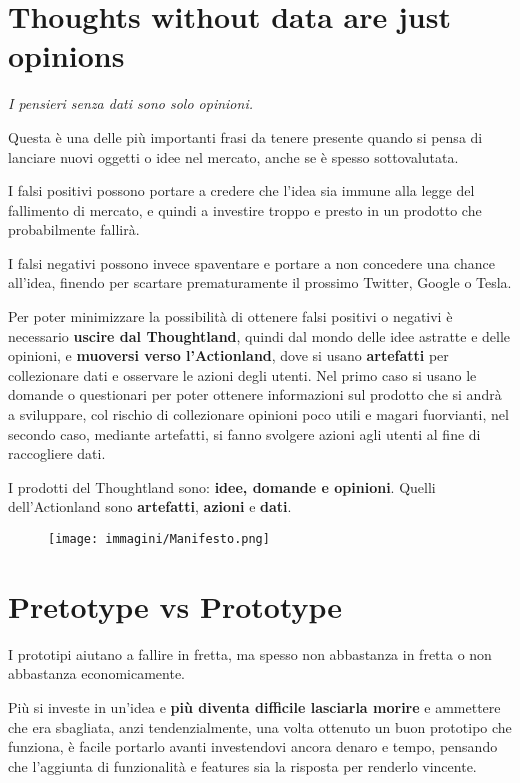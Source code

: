 \pagebreak

\section{Thoughts without data are just opinions}

\begin{flushleft}
	\textit{I pensieri senza dati sono solo opinioni.}
\end{flushleft}

Questa è una delle più importanti frasi da tenere presente quando si pensa di lanciare nuovi oggetti o idee nel mercato, anche se è spesso sottovalutata.

I falsi positivi possono portare a credere che l'idea sia immune alla legge del
fallimento di mercato, e quindi a investire troppo e presto in un prodotto che probabilmente fallirà.

I falsi negativi possono invece spaventare e portare a non concedere una chance all'idea, finendo per scartare prematuramente il prossimo Twitter, Google o Tesla.

Per poter minimizzare la possibilità di ottenere falsi positivi o negativi è necessario \textbf{uscire dal Thoughtland}, quindi dal mondo delle idee astratte e delle opinioni, e \textbf{muoversi verso l'Actionland}, dove si usano \textbf{artefatti} per collezionare dati e osservare le azioni degli utenti. Nel primo caso si usano le domande o questionari per poter ottenere informazioni sul prodotto
che si andrà a sviluppare, col rischio di collezionare opinioni poco utili e magari fuorvianti, nel secondo caso, mediante artefatti, si fanno svolgere azioni agli utenti al fine di raccogliere dati.

I prodotti del Thoughtland sono: \textbf{idee, domande e opinioni}. Quelli dell'Actionland sono \textbf{artefatti}, \textbf{azioni} e \textbf{dati}.

\begin{figure}[!h]
	\centering
	\texttt{[image: immagini/Manifesto.png]}
\end{figure}

\section{Pretotype vs Prototype}
I prototipi aiutano a fallire in fretta, ma spesso non abbastanza in fretta o non abbastanza economicamente.

Più si investe in un'idea e \textbf{più diventa difficile lasciarla morire} e ammettere che era sbagliata, anzi tendenzialmente, una volta ottenuto un buon prototipo che funziona, è facile portarlo avanti investendovi ancora denaro e tempo, pensando che l'aggiunta di funzionalità e features sia la risposta per renderlo vincente.

